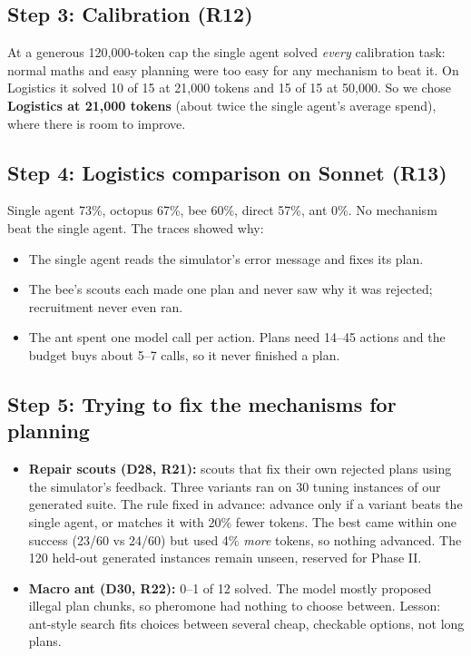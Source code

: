 \documentclass[11pt,a4paper]{article}
\begin{document}
\subsection*{Step 3: Calibration (R12)}
At a generous 120,000-token cap the single agent solved \emph{every} calibration task: normal maths and
easy planning were too easy for any mechanism to beat it. On Logistics it solved 10 of 15 at 21,000 tokens
and 15 of 15 at 50,000. So we chose \textbf{Logistics at 21,000 tokens} (about twice the single agent's
average spend), where there is room to improve.

\subsection*{Step 4: Logistics comparison on Sonnet (R13)}
Single agent 73\%, octopus 67\%, bee 60\%, direct 57\%, ant 0\%. No mechanism beat the single agent. The
traces showed why:
\begin{itemize}
  \item The single agent reads the simulator's error message and fixes its plan.
  \item The bee's scouts each made one plan and never saw why it was rejected; recruitment never even ran.
  \item The ant spent one model call per action. Plans need 14--45 actions and the budget buys about 5--7
        calls, so it never finished a plan.
\end{itemize}

\subsection*{Step 5: Trying to fix the mechanisms for planning}
\begin{itemize}
  \item \textbf{Repair scouts (D28, R21):} scouts that fix their own rejected plans using the simulator's
        feedback. Three variants ran on 30 tuning instances of our generated suite. The rule fixed in advance:
        advance only if a variant beats the single agent, or matches it with 20\% fewer tokens. The best came
        within one success (23/60 vs 24/60) but used 4\% \emph{more} tokens, so nothing advanced. The 120
        held-out generated instances remain unseen, reserved for Phase II.
  \item \textbf{Macro ant (D30, R22):} 0--1 of 12 solved. The model mostly proposed illegal plan chunks, so
        pheromone had nothing to choose between. Lesson: ant-style search fits choices between several
        cheap, checkable options, not long plans.
\end{itemize}
\end{document}
